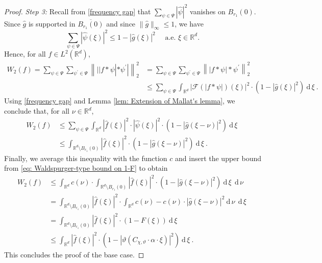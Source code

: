 \documentclass[11pt]{amsart}
\newcommand{\R}{{\mathbb{R}}}
\newcommand{\dxi}{\:\mathrm{d}\,\xi\:}
\newcommand{\dnu}{\:\mathrm{d}\,\nu\:}
\newcommand{\abs}[1]{\ensuremath{\left|\text{}#1\text{}\right|}}
\newcommand{\norm}[1]{\ensuremath{\left\lVert\text{}#1\text{}\right\rVert}}
\newenvironment{proof sketch} {\textit{Proof sketch.}}{}
\begin{document}
\begin{proof}
    \textit{Step 3:}
    Recall from \eqref{frequency gap} that $\sum_{\psi \in \Psi} |\widehat{\psi}|^2$ vanishes on $B_{r_1}(0)$. Since $\widehat{g}$ is supported in $\overline{B_{r_1}(0)}$ and since $\|\widehat{g}\|_{\infty}\leq 1$, we have 
    \[\sum_{\psi \in \Psi} |\widehat{\psi}(\xi)|^2\leq 1-|\widehat{g}(\xi)|^2 \quad \text{ a.e. } \xi \in \R^d.\]
    Hence, for all $f \in L^2(\R^d)$,
    \begin{align*}
      W_2(f)=\sum_{\psi \in \Psi}\sum_{\psi^\prime \in \Psi} \norm{||f*\psi|*\psi^\prime|}_2^2 &= \sum_{\psi \in \Psi}\sum_{\psi^\prime \in \Psi} \norm{|f*\psi|*\psi^\prime}_2^2 \\
      &\leq \sum_{\psi \in \Psi} \int_{\R^d} \abs{\mathcal{F}(|f*\psi|)(\xi)}^2 \cdot \left(1-|\widehat{g}(\xi)|^2\right) \dxi. 
    \end{align*}
    Using \eqref{frequency gap} and Lemma \ref{lem: Extension of Mallat's lemma}, we conclude that, for all $\nu \in \R^d$,
    \begin{align*}
      W_2(f)&\leq \sum_{\psi \in \Psi} \int_{\R^d} |\widehat{f}(\xi)|^2 \cdot |\widehat{\psi}(\xi)|^2 \cdot \left(1-|\widehat{g}(\xi-\nu)|^2\right) \dxi \\
      &\leq \int_{\R^d\setminus B_{r_1}(0)} |\widehat{f}(\xi)|^2 \cdot \left(1-|\widehat{g}(\xi-\nu)|^2\right) \dxi.
    \end{align*}
    Finally, we average this inequality with the function $c$ and insert the upper bound from \eqref{eq: Waldspurger-type bound on 1-F} to obtain
    \begin{align*}
      W_2(f)&\leq \int_{\R^d} c(\nu) \cdot \int_{\R^d\setminus B_{r_1}(0)} |\widehat{f}(\xi)|^2 \cdot \left(1-|\widehat{g}(\xi-\nu)|^2\right) \dxi \dnu \\
      &= \int_{\R^d\setminus B_{r_1}(0)} |\widehat{f}(\xi)|^2 \cdot \int_{\R^d} c(\nu)-c(\nu) \cdot |\widehat{g}(\xi-\nu)|^2  \dnu \dxi \\
      &= \int_{\R^d\setminus B_{r_1}(0)} |\widehat{f}(\xi)|^2 \cdot \left(1-F(\xi)\right) \dxi\\
      &\leq \int_{\R^d} |\widehat{f}(\xi)|^2 \cdot \left(1-|\vartheta(C_{\chi,\vartheta} \cdot \alpha \cdot \xi)|^2\right) \dxi.
    \end{align*}
    This concludes the proof of the base case.
  

\end{proof}
\end{document}
